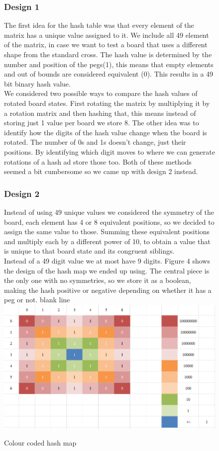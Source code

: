 \documentclass[11pt]{article}
\begin{document}
\begin{figure}
\subsubsection*{Design 1}
The first idea for the hash table was that every element of the matrix has a unique value assigned to it. We include all 49 element of the matrix, in case we want to test a board that uses a different shape from the standard cross. The hash value is determined by the number and position of the pegs(1), this means that empty elements and out of bounds are considered equivalent (0). This results in a 49 bit binary hash value.\\ We considered two possible ways to compare the hash values of rotated board states. First rotating the matrix by multiplying it by a rotation matrix and then hashing that, this means instead of storing just 1 value per board we store 8. The other idea was to identify how the digits of the hash value change when the board is rotated. The number of 0s and 1s doesn't change, just their positions. By identifying which digit moves to where we can generate rotations of a hash ad store those too.
Both of these methods seemed a bit cumbersome so we came up with design 2 instead.
\subsubsection*{Design 2}
Instead of using 49 unique values we considered the symmetry of the board, each element has 4 or 8 equivalent positions, so we decided to assign the same value to those. Summing these equivalent positions and multiply each by a different power of 10, to obtain a value that is unique to that board state and its congruent siblings.\\
Instead of a 49 digit value we at most have 9 digits.
Figure 4 shows the design of the hash map we ended up using. The central piece is the only one with no symmetries, so we store it as a boolean, making the hash positive or negative depending on whether it has a peg or not.
\newline
\color{white} blank line\\
\color{black}
\includegraphics[width=\textwidth]{4}
\caption{Colour coded hash map} 
\label{fig: 3}
\end{figure}
\newpage
\end{document}
